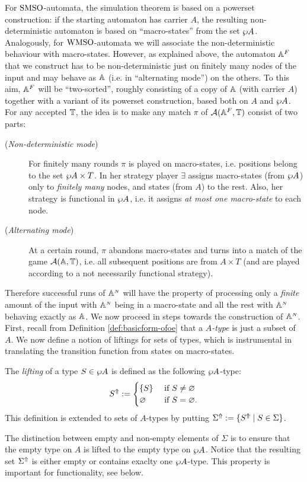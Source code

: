 For $\mathrm{SMSO}$-automata, the simulation theorem is based on a powerset construction:
if the starting automaton has carrier $A$, the resulting non-deterministic
automaton is based on ``macro-states'' from the set $\wp A$.
Analogously, for $\mathrm{WMSO}$-automata we will associate the non-deterministic
behaviour with macro-states.
However, as explained above, the automaton $\mathbb{A}^{F}$ that we construct has to
be non-deterministic just on finitely many nodes of the input and may behave as
$\mathbb{A}$ (i.e. in ``alternating mode'') on the others.
To this aim, $\mathbb{A}^{F}$ will be ``two-sorted'', roughly consisting of a copy of
$\mathbb{A}$ (with carrier $A$) together with a variant of its powerset construction,
based both on $A$ and $\wp A$.
For any accepted $\mathbb{T}$, the idea is to make any match $\pi$ of
$\mathcal{A}(\mathbb{A}^{F},\mathbb{T})$ consist of two parts:
\begin{description}
\item[(\textit{Non-deterministic mode})] For finitely many rounds $\pi$ is
  played on macro-states, i.e. positions belong to the set $\wp A \times T$.
  In her strategy player $\exists$ assigns macro-states (from $\wp A$) only to
  \emph{finitely many} nodes, and states (from $A$) to the rest.
  Also, her strategy is functional in $\wp A$, i.e. it assigns \emph{at most one
  macro-state} to each node.
\item[(\textit{Alternating mode})] At a certain round, $\pi$ abandons
  macro-states and turns into a match of the game $\mathcal{A}(\mathbb{A},\mathbb{T})$, i.e. all
  subsequent positions are from $A \times T$ (and are played according to a
  not necessarily functional strategy).
\end{description}
Therefore successful runs of $\mathbb{A}^{{\scriptscriptstyle N}}$ will have the property of processing 
only a \emph{finite} amount of the input with $\mathbb{A}^{{\scriptscriptstyle N}}$ being in a 
macro-state and all the rest with $\mathbb{A}^{{\scriptscriptstyle N}}$ behaving exactly as $\mathbb{A}$.
We now proceed in steps towards the construction of $\mathbb{A}^{{\scriptscriptstyle N}}$. 
First, recall from Definition \ref{def:basicform-ofoe} that a \emph{$A$-type} is
just a subset of $A$. 
We now define a notion of liftings for sets of types, which is instrumental in
translating the transition function from states on macro-states.

\begin{definition}
The \emph{lifting} of a type $S \in \wp A$ is defined as the following
$\wp A$-type:
\[
\lift{S} \isdef 
\begin{cases} \{ S \} & \text{ if } S \neq \nada \\
\nada & \text{ if } S = \nada.
\end{cases}
\]
This definition is extended to sets of $A$-types by putting $\Sigma^{\Uparrow} 
\mathrel{:=} \{ S^{\Uparrow} \mid S \in \Sigma \}$.
\end{definition}
The distinction between empty and non-empty elements of $\Sigma$ is to ensure 
that the empty type on $A$ is lifted to the empty type on $\wp A$. 
Notice that the resulting set $\Sigma^{\Uparrow}$ is either empty or 
contains exaclty one $\wp A$-type.
This property is important for functionality, see below.


